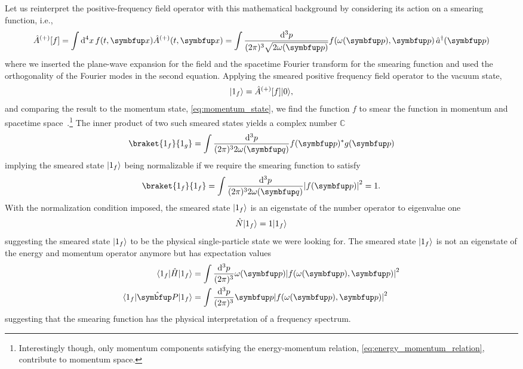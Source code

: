 Let us reinterpret the positive-frequency field operator with this mathematical background by considering its action on a smearing function, i.e.,
\begin{equation}
	\hat{A}^{(+)}[f]
	=
	\int\dd[4]{x}
	f(t,\vb{x})
	\hat{A}^{(+)}(t,\vb{x})
	=
	\int\frac{\dd[3]{p}}{(2\pi)^3\sqrt{2\omega(\vb{p})}}
	f\!\left(\omega(\vb{p}),\vb{p}\right)
	\hat{a}^\dagger(\vb{p})
\end{equation}
where we inserted the plane-wave expansion for the field and the spacetime Fourier transform for the smearing function and used the orthogonality of the Fourier modes in the second equation.
Applying the smeared positive frequency field operator to the vacuum state,
\begin{equation}
	\begin{split}
		\ket{1_f}
		=
		\hat{A}^{(+)}[f]
		\vacket
		,
	\end{split}
	\label{eq:single_particle_state}
\end{equation}
and comparing the result to the momentum state, \cref{eq:momentum_state}, we find the function $f$ to smear the function in momentum and spacetime space~\cite[p.~35]{Srednicki2007}.\footnote{Interestingly though, only momentum components satisfying the energy-momentum relation, \cref{eq:energy_momentum_relation}, contribute to momentum space.}
The inner product of two such smeared states yields a complex number $\mathbb{C}$
\begin{equation}
	\braket{1_f}{1_g}
	=
	\int\frac{\dd[3]{p}}{(2\pi)^32\omega(\vb{q})}
	f(\vb{p})^*
	g(\vb{p})
\end{equation}
implying the smeared state $\lvert1_f\rangle$ being normalizable if we require the smearing function to satisfy
\begin{equation}
	\braket{1_f}{1_f}
	=
	\int\frac{\dd[3]{p}}{(2\pi)^32\omega(\vb{q})}
	\abs*{f(\vb{p})}^2
	=
	1
	\label{eq:spectrum_normalization}
	.
\end{equation}
With the normalization condition imposed, the smeared state $\lvert1_f\rangle$ is an eigenstate of the number operator to eigenvalue one
\begin{equation}
	\hat{N}
	\lvert1_f\rangle
	=
	1
	\lvert1_f\rangle
\end{equation}
suggesting the smeared state $\lvert1_f\rangle$ to be the physical single-particle state we were looking for.
The smeared state $\lvert1_f\rangle$ is not an eigenstate of the energy and momentum operator anymore but has expectation values
\begin{align}
	\bra{1_f}
	\hat{H}
	\ket{1_f}
	&=
	\int\frac{\dd[3]{p}}{(2\pi)^3}
	\omega(\vb{p})
	\abs*{f\!\left(\omega(\vb{p}),\vb{p}\right)}^2
	\\
	\bra{1_f}
	\vu{P}
	\ket{1_f}
	&=
	\int\frac{\dd[3]{p}}{(2\pi)^3}
	\vb{p}
	\abs*{f\!\left(\omega(\vb{p}),\vb{p}\right)}^2
\end{align}
suggesting that the smearing function has the physical interpretation of a frequency spectrum.

